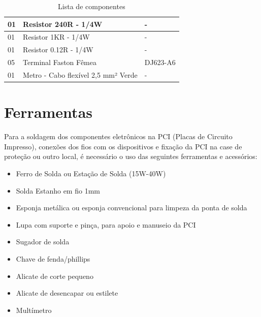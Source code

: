 \begin{table}[H]
\begin{tabular}{|m{1.8cm} |m{8.8cm}|m{3.5cm}|}
01& Resistor 240R - 1/4W & - \\\hline

01& Resistor 1KR  - 1/4W & - \\\hline

01& Resistor 0.12R - 1/4W & - \\\hline

05 & Terminal Faston Fêmea &   DJ623-A6  \\\hline

01 & Metro - Cabo flexível 2,5 mm² Verde & - \\\hline

\end{tabular}
\caption{Lista de componentes}
\end{table}

\section{Ferramentas}

\par Para a soldagem dos componentes eletrônicos na PCI (Placas de Circuito Impresso), conexões dos fios com os dispositivos e fixação da PCI na case de proteção ou outro local, é necessário o uso das seguintes ferramentas e acessórios:

\begin{itemize}
    \item Ferro de Solda ou Estação de Solda (15W-40W)
    \item Solda Estanho em fio 1mm
    \item Esponja metálica ou esponja convencional para limpeza da ponta de solda
    \item Lupa com suporte e pinça, para apoio e manuseio da PCI
    \item Sugador de solda
    \item Chave de fenda/phillips
    \item Alicate de corte pequeno
    \item Alicate de desencapar ou estilete
    \item Multímetro
\end{itemize}

